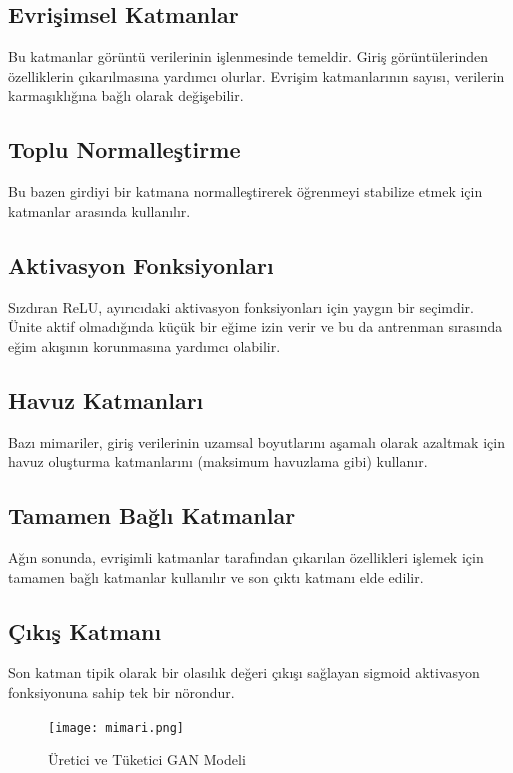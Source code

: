 \documentclass[10pt]{article}
\begin{document}
	\subsection{Evrişimsel Katmanlar}
	Bu katmanlar görüntü verilerinin işlenmesinde temeldir. Giriş görüntülerinden özelliklerin çıkarılmasına yardımcı olurlar. Evrişim katmanlarının sayısı, verilerin karmaşıklığına bağlı olarak değişebilir.
	\subsection{Toplu Normalleştirme}
	Bu bazen girdiyi bir katmana normalleştirerek öğrenmeyi stabilize etmek için katmanlar arasında kullanılır.
	
	
	
	\subsection{Aktivasyon Fonksiyonları}
	Sızdıran ReLU, ayırıcıdaki aktivasyon fonksiyonları için yaygın bir seçimdir. Ünite aktif olmadığında küçük bir eğime izin verir ve bu da antrenman sırasında eğim akışının korunmasına yardımcı olabilir.
	
	\subsection{Havuz Katmanları}
	Bazı mimariler, giriş verilerinin uzamsal boyutlarını aşamalı olarak azaltmak için havuz oluşturma katmanlarını (maksimum havuzlama gibi) kullanır.
	
	\subsection{Tamamen Bağlı Katmanlar}
	Ağın sonunda, evrişimli katmanlar tarafından çıkarılan özellikleri işlemek için tamamen bağlı katmanlar kullanılır ve son çıktı katmanı elde edilir.
	
	
	\subsection{Çıkış Katmanı}
	Son katman tipik olarak bir olasılık değeri çıkışı sağlayan sigmoid aktivasyon fonksiyonuna sahip tek bir nörondur.
	\begin{figure}[htbp]
		\centering
		\texttt{[image: mimari.png]}
		\caption{Üretici ve Tüketici GAN Modeli \cite{kaggle}}
		\label{fig:uretici_tuketici}
	\end{figure}
	
\end{document}
